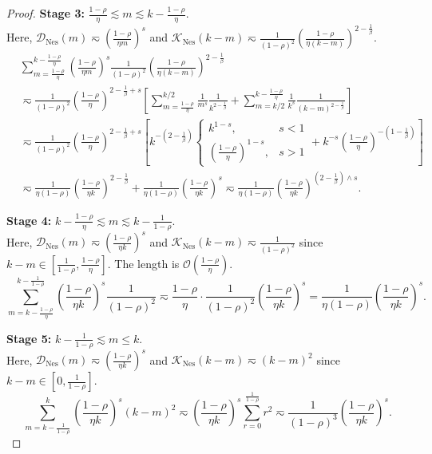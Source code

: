 \begin{proof}
\textbf{Stage 3:} $\frac{1-\rho}{\eta} \lesssim m \lesssim k - \frac{1-\rho}{\eta}$. \\
Here, $\mathcal D_{\mathrm{Nes}}(m) \eqsim \left(\frac{1-\rho}{\eta m}\right)^s$ and $\mathcal K_{\mathrm{Nes}}(k-m) \eqsim \frac{1}{(1-\rho)^2} \left(\frac{1-\rho}{\eta (k-m)}\right)^{2-\frac1\beta}$.
\begin{align*}
    &\sum_{m=\frac{1-\rho}{\eta}}^{k - \frac{1-\rho}{\eta}} \left(\frac{1-\rho}{\eta m}\right)^s \frac{1}{(1-\rho)^2} \left(\frac{1-\rho}{\eta (k-m)}\right)^{2-\frac1\beta} \\
    &\eqsim \frac{1}{(1-\rho)^2} \left(\frac{1-\rho}{\eta}\right)^{2-\frac1\beta+s} \left[ \sum_{m=\frac{1-\rho}{\eta}}^{k/2} \frac{1}{m^s} \frac{1}{k^{2-\frac1\beta}} + \sum_{m=k/2}^{k-\frac{1-\rho}{\eta}} \frac{1}{k^s} \frac{1}{(k-m)^{2-\frac1\beta}} \right] \\
    &\eqsim \frac{1}{(1-\rho)^2} \left(\frac{1-\rho}{\eta}\right)^{2-\frac1\beta+s} \left[ k^{-\left(2-\frac1\beta\right)} \begin{cases} k^{1-s}, & s<1 \\ \left(\frac{1-\rho}{\eta}\right)^{1-s}, & s>1 \end{cases} + k^{-s} \left(\frac{1-\rho}{\eta}\right)^{-\left(1-\frac1\beta\right)} \right] \\
    &\eqsim \frac{1}{\eta(1-\rho)} \left(\frac{1-\rho}{\eta k}\right)^{2-\frac1\beta} + \frac{1}{\eta(1-\rho)} \left(\frac{1-\rho}{\eta k}\right)^s \eqsim \frac{1}{\eta(1-\rho)} \left(\frac{1-\rho}{\eta k}\right)^{\left(2-\frac1\beta\right)\wedge s}.
\end{align*}

\textbf{Stage 4:} $k - \frac{1-\rho}{\eta} \lesssim m \lesssim k - \frac{1}{1-\rho}$. \\
Here, $\mathcal D_{\mathrm{Nes}}(m) \eqsim \left(\frac{1-\rho}{\eta k}\right)^s$ and $\mathcal K_{\mathrm{Nes}}(k-m) \eqsim \frac{1}{(1-\rho)^2}$ since $k-m \in [\frac{1}{1-\rho}, \frac{1-\rho}{\eta}]$. The length is $\mathcal{O}(\frac{1-\rho}{\eta})$.
\[
    \sum_{m=k-\frac{1-\rho}{\eta}}^{k-\frac{1}{1-\rho}} \left(\frac{1-\rho}{\eta k}\right)^s \frac{1}{(1-\rho)^2} \eqsim \frac{1-\rho}{\eta} \cdot \frac{1}{(1-\rho)^2} \left(\frac{1-\rho}{\eta k}\right)^s = \frac{1}{\eta(1-\rho)} \left(\frac{1-\rho}{\eta k}\right)^s.
\]

\textbf{Stage 5:} $k - \frac{1}{1-\rho} \lesssim m \le k$. \\
Here, $\mathcal D_{\mathrm{Nes}}(m) \eqsim \left(\frac{1-\rho}{\eta k}\right)^s$ and $\mathcal K_{\mathrm{Nes}}(k-m) \eqsim (k-m)^2$ since $k-m \in [0, \frac{1}{1-\rho}]$.
\[
    \sum_{m=k-\frac{1}{1-\rho}}^{k} \left(\frac{1-\rho}{\eta k}\right)^s (k-m)^2 \eqsim \left(\frac{1-\rho}{\eta k}\right)^s \sum_{r=0}^{\frac{1}{1-\rho}} r^2 \eqsim \frac{1}{(1-\rho)^3} \left(\frac{1-\rho}{\eta k}\right)^s.
\]


\end{proof}
